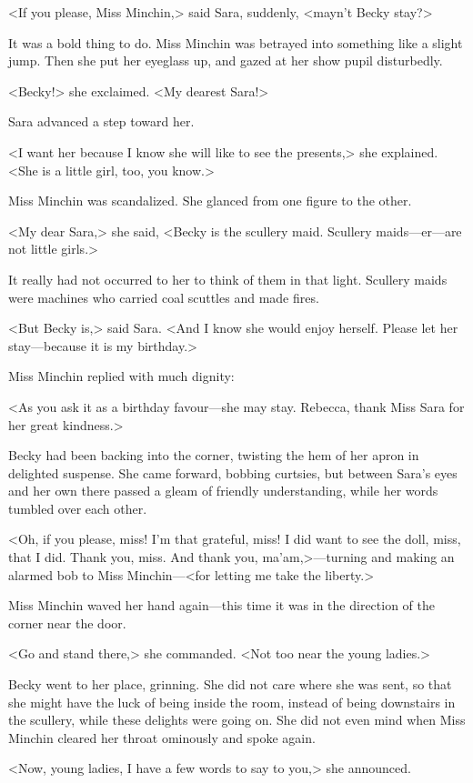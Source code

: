 <If you please, Miss Minchin,> said Sara, suddenly, <mayn't Becky stay?>

It was a bold thing to do. Miss Minchin was betrayed into something like a slight jump. Then she put her eyeglass up, and gazed at her show pupil disturbedly.

<Becky!> she exclaimed. <My dearest Sara!>

Sara advanced a step toward her.

<I want her because I know she will like to see the presents,> she explained. <She is a little girl, too, you know.>

Miss Minchin was scandalized. She glanced from one figure to the other.

<My dear Sara,> she said, <Becky is the scullery maid. Scullery maids—er—are not little girls.>

It really had not occurred to her to think of them in that light. Scullery maids were machines who carried coal scuttles and made fires.

<But Becky is,> said Sara. <And I know she would enjoy herself. Please let her stay—because it is my birthday.>

Miss Minchin replied with much dignity:

<As you ask it as a birthday favour—she may stay. Rebecca, thank Miss Sara for her great kindness.>

Becky had been backing into the corner, twisting the hem of her apron in delighted suspense. She came forward, bobbing curtsies, but between Sara's eyes and her own there passed a gleam of friendly understanding, while her words tumbled over each other.

<Oh, if you please, miss! I'm that grateful, miss! I did want to see the doll, miss, that I did. Thank you, miss. And thank you, ma'am,>—turning and making an alarmed bob to Miss Minchin—<for letting me take the liberty.>

Miss Minchin waved her hand again—this time it was in the direction of the corner near the door.

<Go and stand there,> she commanded. <Not too near the young ladies.>

Becky went to her place, grinning. She did not care where she was sent, so that she might have the luck of being inside the room, instead of being downstairs in the scullery, while these delights were going on. She did not even mind when Miss Minchin cleared her throat ominously and spoke again.

<Now, young ladies, I have a few words to say to you,> she announced.

